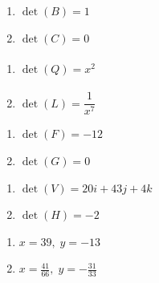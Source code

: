 \documentclass{ximera}
\begin{document}
	\author{Stitz-Zeager}



\label{ExercisesforDeterminants}



\begin{multicols}{2}
\begin{enumerate}

\item $\det(B) = 1$
\item $\det(C) = 0$

\setcounter{HW}{\value{enumi}}
\end{enumerate}
\end{multicols}

\begin{multicols}{2}
\begin{enumerate}
\setcounter{enumi}{\value{HW}}

\item $\det(Q) = x^{2} \phantom{\dfrac{1}{x^{7}}}$
\item $\det(L) = \dfrac{1}{x^{7}}$

\setcounter{HW}{\value{enumi}}
\end{enumerate}
\end{multicols}

\begin{multicols}{2}
\begin{enumerate}
\setcounter{enumi}{\value{HW}}

\item $\det(F) = -12$
\item $\det(G) = 0$

\setcounter{HW}{\value{enumi}}
\end{enumerate}
\end{multicols}

\begin{multicols}{2}
\begin{enumerate}
\setcounter{enumi}{\value{HW}}

\item $\det(V) = 20i + 43j + 4k$
\item $\det(H) = -2$

\setcounter{HW}{\value{enumi}}
\end{enumerate}
\end{multicols}

\begin{multicols}{2}
\begin{enumerate}
\setcounter{enumi}{\value{HW}}

\item $x = 39, \; y = -13$
\item $x = \frac{41}{66}, \; y=-\frac{31}{33}$

\setcounter{HW}{\value{enumi}}
\end{enumerate}
\end{multicols}
\end{document}
